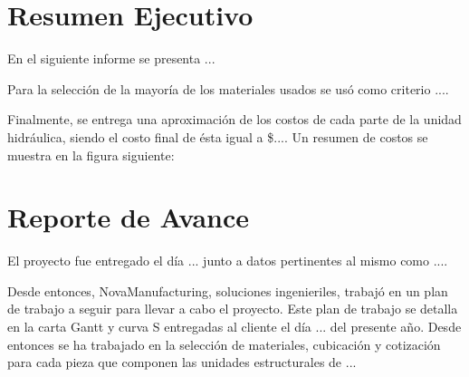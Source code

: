 \documentclass[12pt]{article}
\begin{document}
\thispagestyle{empty} %

\newpage
\thispagestyle{empty} %

\section*{Resumen Ejecutivo}

\qquad En el siguiente informe se presenta ...

\qquad Para la selección de la mayoría de los materiales usados se usó como criterio ....

\qquad Finalmente, se entrega una aproximación de los costos de cada parte de la unidad hidráulica, siendo el costo final de ésta igual a \$.... Un resumen de costos se muestra en la figura siguiente:




\newpage
\thispagestyle{empty}
\clearpage
\tableofcontents
\listoffigures
\listoftables
\thispagestyle{empty}
\clearpage
\setcounter{page}{1}





\section{Reporte de Avance}

\qquad El proyecto fue entregado el día ... junto a datos pertinentes al mismo como ....

\qquad Desde entonces, NovaManufacturing, soluciones ingenieriles, trabajó en un plan de trabajo a seguir para llevar a cabo el proyecto. Este plan de trabajo se detalla en la carta Gantt y curva S entregadas al cliente el día ... del presente año. Desde entonces se ha trabajado en la selección de materiales, cubicación y cotización para cada pieza que componen las unidades estructurales de ...
\end{document}
